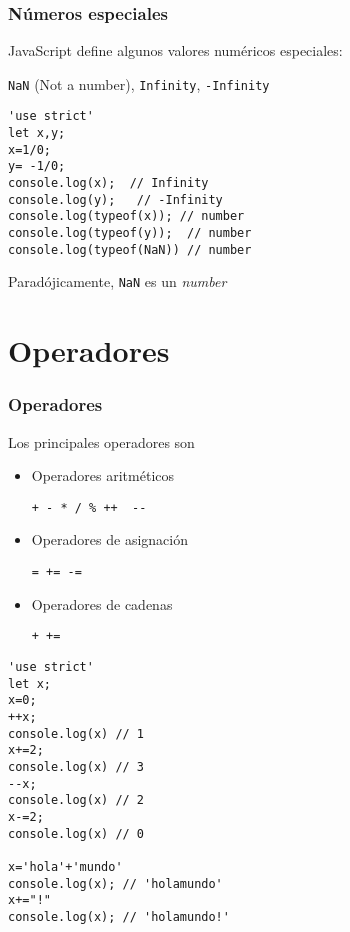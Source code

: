 \documentclass[ucs]{beamer}
\begin{document}
\begin{frame}[fragile]
\frametitle{Números especiales}
JavaScript define algunos valores numéricos especiales:

\verb|NaN| (Not a number), 
\verb|Infinity|,
\verb|-Infinity|

  \begin{scriptsize}
  \begin{verbatim}
'use strict'
let x,y;
x=1/0;
y= -1/0;
console.log(x);  // Infinity
console.log(y);   // -Infinity
console.log(typeof(x)); // number
console.log(typeof(y));  // number
console.log(typeof(NaN)) // number
  \end{verbatim}
  \end{scriptsize}

Paradójicamente, 
\verb|NaN| es un
\emph{number}
\end{frame}




\section{Operadores}
\begin{frame}[fragile]
\frametitle{Operadores}
Los principales operadores son
\begin{itemize}
\item
Operadores aritméticos

\verb|+ - * / % ++  --|

\item
Operadores de asignación

\verb|= += -=|

\item
Operadores de cadenas

\verb|+ +=|

\end{itemize}


\end{frame}

\begin{frame}[fragile]

  \begin{scriptsize}
  \begin{verbatim}
'use strict'
let x;
x=0;
++x;
console.log(x) // 1
x+=2;
console.log(x) // 3
--x;
console.log(x) // 2
x-=2;
console.log(x) // 0

x='hola'+'mundo'
console.log(x); // 'holamundo'
x+="!"
console.log(x); // 'holamundo!'
  \end{verbatim}
  \end{scriptsize}


\end{frame}
\end{document}
